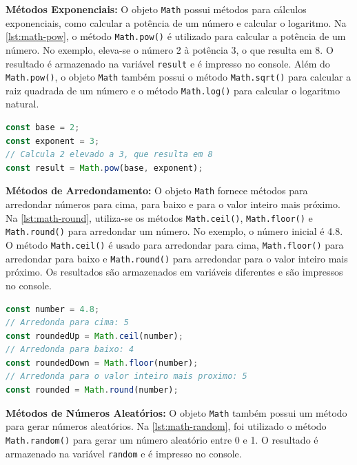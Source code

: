 \textbf{Métodos Exponenciais:} O objeto \texttt{Math} possui métodos para cálculos exponenciais, como calcular a potência de um número e calcular o logaritmo. Na \autoref{lst:math-pow}, o método \texttt{Math.pow()} é utilizado para calcular a potência de um número. No exemplo, eleva-se o número 2 à potência 3, o que resulta em 8. O resultado é armazenado na variável \texttt{result} e é impresso no console. Além do \texttt{Math.pow()}, o objeto \texttt{Math} também possui o método \texttt{Math.sqrt()} para calcular a raiz quadrada de um número e o método \texttt{Math.log()} para calcular o logaritmo natural.

\Needspace{0.3\textheight}
\begin{lstlisting}[language=TypeScript, caption=Exemplo de uso do método \texttt{Math.pow()}., label=lst:math-pow]
const base = 2;
const exponent = 3;
// Calcula 2 elevado a 3, que resulta em 8
const result = Math.pow(base, exponent); 
\end{lstlisting}



\textbf{Métodos de Arredondamento:} O objeto \texttt{Math} fornece métodos para arredondar números para cima, para baixo e para o valor inteiro mais próximo. Na \autoref{lst:math-round}, utiliza-se os métodos \texttt{Math.ceil()}, \texttt{Math.floor()} e \texttt{Math.round()} para arredondar um número. No exemplo, o número inicial é 4.8. O método \texttt{Math.ceil()} é usado para arredondar para cima, \texttt{Math.floor()} para arredondar para baixo e \texttt{Math.round()} para arredondar para o valor inteiro mais próximo. Os resultados são armazenados em variáveis diferentes e são impressos no console.

\begin{lstlisting}[language=TypeScript, caption=Exemplo de uso dos métodos de arredondamento em \texttt{Math}., label=lst:math-round]
const number = 4.8;
// Arredonda para cima: 5
const roundedUp = Math.ceil(number); 
// Arredonda para baixo: 4
const roundedDown = Math.floor(number); 
// Arredonda para o valor inteiro mais proximo: 5
const rounded = Math.round(number); 
\end{lstlisting}



\textbf{Métodos de Números Aleatórios:} O objeto \texttt{Math} também possui um método para gerar números aleatórios. Na \autoref{lst:math-random}, foi utilizado o método \texttt{Math.random()} para gerar um número aleatório entre 0 e 1. O resultado é armazenado na variável \texttt{random} e é impresso no console.

